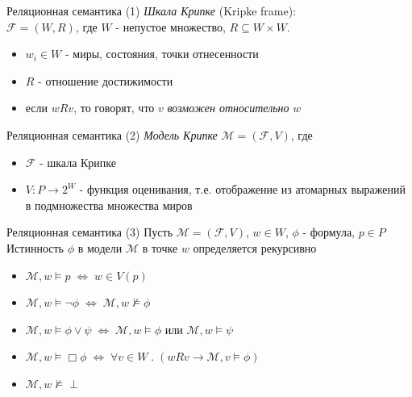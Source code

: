 \documentclass{beamer}
\begin{document}
\begin{frame}{Реляционная семантика (1)}
\textit{Шкала Крипке} (Kripke frame):\\
\bigskip
$\mathcal{F} = (W, R)$, где $W$ - непустое множество, $R \subseteq W \times W$.\\
\bigskip
\begin{itemize}
  \item $w_i \in W$ - миры, состояния, точки отнесенности
  \item $R$ - отношение достижимости
  \item если $wRv$, то говорят, что $v$ \textit{возможен относительно} $w$
\end{itemize}
\end{frame}

\begin{frame}{Реляционная семантика (2)}
\textit{Модель Крипке} $\mathcal{M} = (\mathcal{F}, V)$, где  
\bigskip
\begin{itemize}
  \item $\mathcal{F}$ - шкала Крипке
  \item $V : P \to 2^W$ - функция оценивания, т.е. отображение из атомарных выражений в подмножества множества миров
\end{itemize}
\bigskip
\end{frame}

\begin{frame}{Реляционная семантика (3)}
Пусть $\mathcal{M} = (\mathcal{F}, V)$, $w \in W$, $\phi$ - формула, $p \in P$\\
\bigskip
Истинность $\phi$ в модели $\mathcal{M}$ в точке $w$ определяется рекурсивно\\
\bigskip
\begin{itemize}
  \item $\mathcal{M}, w \models p \; \Longleftrightarrow \; w \in V(p)$
  \item $\mathcal{M}, w \models \neg \phi \; \Longleftrightarrow \; \mathcal{M}, w \not\models \phi$
  \item $\mathcal{M}, w \models \phi \vee \psi \; \Longleftrightarrow \; \mathcal{M}, w \models \phi$ или $\mathcal{M}, w \models \psi$
  \item $\mathcal{M}, w \models \Box \phi \; \Longleftrightarrow \; \forall v \in W \; . \; (w R v \to \mathcal{M}, v \models \phi)$
  \item $\mathcal{M}, w \not\models \perp$
\end{itemize}
\end{frame}
\end{document}
